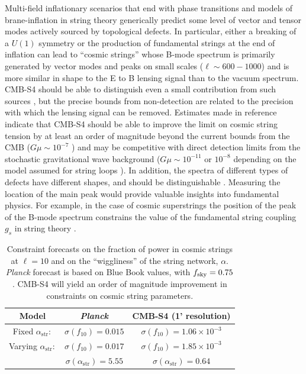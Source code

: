 Multi-field inflationary scenarios that end with phase transitions \cite{Hindmarsh:1994re,Vilenkin:1981iu,Kofman:1995fi,Tkachev:1998dc,Jeannerot:1995yn,Jeannerot:2003qv,Rocher:2004my} and models of brane-inflation in string theory \cite{Sarangi:2002yt,Jones:2003da,Copeland:2003bj} generically predict some level of vector and tensor modes actively sourced by topological defects. In particular, either a breaking of a $U(1)$ symmetry or the production of fundamental strings at the end of inflation can lead to ``cosmic strings'' whose B-mode spectrum is primarily generated by vector modes and peaks on small scales ($\ell\sim 600 - 1000$) and is more similar in shape to the E to B lensing signal than to the vacuum spectrum. CMB-S4 should be able to distinguish even a small contribution from such sources \cite{Urrestilla:2008jv}, but the precise bounds from non-detection are related to the precision with which the lensing signal can be removed. Estimates made in reference \cite{Seljak:2006hi,Avgoustidis:2011ax} indicate that CMB-S4 should be able to improve the limit on cosmic string tension by at least an order of magnitude beyond the current bounds from the CMB ($G\mu\sim10^{-7}$ \cite{Ade:2015ava,Ade:2013xla}) and may be competitive with direct detection limits from the stochastic gravitational wave background ($G\mu\sim10^{-11}$ or $10^{-8}$ depending on the model assumed for string loops \cite{Arzoumanian:2015liz}). In addition, the spectra of different types of defects have different shapes, and should be distinguishable \cite{Urrestilla:2007sf,Avgoustidis:2011ax}. Measuring the location of the main peak would provide valuable insights into fundamental physics. For example, in the case of cosmic superstrings the position of the peak of the B-mode spectrum constrains the value of the fundamental string coupling $g_s$ in string theory \cite{Avgoustidis:2011ax}. 

\begin{table}[htbp!]\label{tab:string_forecast}
  \begin{center}
    \begin{tabular}{ c || c | c }
      \hline
       Model & {\it Planck} & CMB-S4 (1' resolution)  \\ \hline \hline
       Fixed $\alpha_\mathrm{str}:$ & $\sigma(f_{10})= 0.015$ & $\sigma(f_{10})=1.06\times 10^{-3}$  \\ \hline
       Varying $\alpha_\mathrm{str}:$ & $\sigma(f_{10})= 0.017$ & $\sigma(f_{10})=1.85\times 10^{-3}$ \\
        & $\sigma(\alpha_\mathrm{str})= 5.55$ & $\sigma(\alpha_\mathrm{str})=0.64$ \\\hline \hline
    \end{tabular}
  \end{center}
  \caption{Constraint forecasts on the fraction of power in cosmic strings at $\ell=10$ and on the ``wiggliness'' of the string network, $\alpha$. {\it Planck\/} forecast is based on Blue Book values, with $f_{\rm sky} = 0.75$. CMB-S4 will yield an order of magnitude improvement in constraints on cosmic string parameters.}
\end{table}

